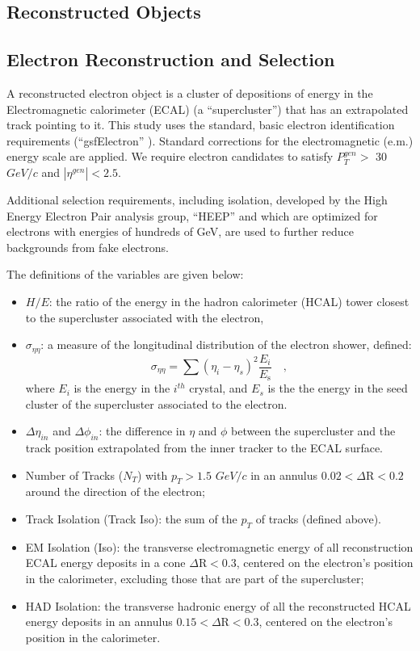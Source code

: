\documentclass{cmspaper}
\begin{document}
\begin{linenumbers}
\section{Reconstructed Objects} 

\subsection{Electron Reconstruction and Selection} \label{sec:electrons}
A reconstructed electron object is a cluster of depositions 
of energy in the Electromagnetic calorimeter (ECAL) (a ``supercluster'') that has an 
extrapolated track pointing to it. This study uses the standard, basic electron
identification requirements (``gsfElectron'' %
).
Standard corrections  for
the electromagnetic (e.m.) energy scale are applied.
We require electron candidates to satisfy $P_{T}^{gen}>$ 30 $GeV/c$ 
and $|\eta^{gen}|<2.5$. 

Additional selection requirements, including isolation,
developed by the High Energy Electron Pair
 analysis group, ``HEEP'' %
and which are optimized for 
electrons with energies of hundreds of GeV,
are used to further reduce backgrounds
from fake electrons.

The definitions of the variables are given below:
%
\begin{itemize}
%
\item $H/E$: the ratio of the energy in the hadron calorimeter (HCAL)
tower closest 
 to the supercluster associated with the electron,
%
\item $\sigma_{\eta\eta}$: a measure of 
the longitudinal distribution of the electron shower, defined:
\begin{displaymath}
\sigma_{\eta\eta} = \sum( \eta_i - \eta_s )^2 \frac{E_i}{E_{\mbox{s}}} \quad ,
\end{displaymath}
where $E_i$ is the energy in the $i^{th}$ crystal, and $E_s$ is the the energy in the seed cluster of the supercluster associated to the electron.
%
\item $\Delta\eta_{in}$ and $\Delta\phi_{in}$: the difference in $\eta$ and $\phi$ between the supercluster and the track position extrapolated from 
the inner tracker to the ECAL surface.
%
\item Number of Tracks ($N_T$) with $p_{T}>1.5$ $GeV/c$ in an annulus $0.02 < \Delta\mbox{R} < 0.2 $ around the direction of the electron;
%
\item Track Isolation (Track Iso): the sum of the $p_{T}$ of tracks (defined above).
%
%
\item EM Isolation (Iso): the transverse electromagnetic energy 
of all reconstruction ECAL energy deposits
in a cone $\Delta\mbox{R} < 0.3$, 
centered on the electron's position in the calorimeter, excluding those
that are part of the supercluster;
%
\item HAD Isolation: the transverse  hadronic energy of all the 
reconstructed HCAL energy deposits in an annulus
$0.15 < \Delta\mbox{R} < 0.3$, centered on the electron's position in the calorimeter. 
%
\end{itemize}


\end{linenumbers}
\end{document}
